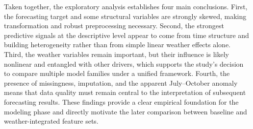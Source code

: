 \documentclass[conference]{IEEEtran}
\begin{document}
Taken together, the exploratory analysis establishes four main conclusions. First, the forecasting target and some structural variables are strongly skewed, making transformation and robust preprocessing necessary. Second, the strongest predictive signals at the descriptive level appear to come from time structure and building heterogeneity rather than from simple linear weather effects alone. Third, the weather variables remain important, but their influence is likely nonlinear and entangled with other drivers, which supports the study's decision to compare multiple model families under a unified framework. Fourth, the presence of missingness, imputation, and the apparent July--October anomaly means that data quality must remain central to the interpretation of subsequent forecasting results. These findings provide a clear empirical foundation for the modeling phase and directly motivate the later comparison between baseline and weather-integrated feature sets.

































\end{document}
